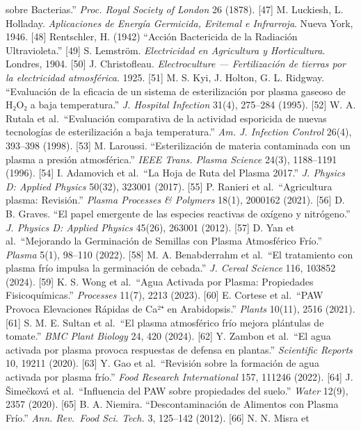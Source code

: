 \documentclass[
  11pt,
  letterpaper,
]{article}
\begin{document}
sobre Bacterias.'' \emph{Proc. Royal Society of London} 26 (1878).
{[}47{]} M. Luckiesh, L. Holladay. \emph{Aplicaciones de Energía
Germicida, Eritemal e Infrarroja}. Nueva York, 1946. {[}48{]}
Rentschler, H. (1942) ``Acción Bactericida de la Radiación
Ultravioleta.'' {[}49{]} S. Lemström. \emph{Electricidad en Agricultura
y Horticultura}. Londres, 1904. {[}50{]} J. Christofleau.
\emph{Electroculture --- Fertilización de tierras por la electricidad
atmosférica}. 1925. {[}51{]} M. S. Kyi, J. Holton, G. L. Ridgway.
``Evaluación de la eficacia de un sistema de esterilización por plasma
gaseoso de H₂O₂ a baja temperatura.'' \emph{J. Hospital Infection}
31(4), 275--284 (1995). {[}52{]} W. A. Rutala et al.~``Evaluación
comparativa de la actividad esporicida de nuevas tecnologías de
esterilización a baja temperatura.'' \emph{Am. J. Infection Control}
26(4), 393--398 (1998). {[}53{]} M. Laroussi. ``Esterilización de
materia contaminada con un plasma a presión atmosférica.'' \emph{IEEE
Trans. Plasma Science} 24(3), 1188--1191 (1996). {[}54{]} I. Adamovich
et al.~``La Hoja de Ruta del Plasma 2017.'' \emph{J. Physics D: Applied
Physics} 50(32), 323001 (2017). {[}55{]} P. Ranieri et al.~``Agricultura
plasma: Revisión.'' \emph{Plasma Processes \& Polymers} 18(1), 2000162
(2021). {[}56{]} D. B. Graves. ``El papel emergente de las especies
reactivas de oxígeno y nitrógeno.'' \emph{J. Physics D: Applied Physics}
45(26), 263001 (2012). {[}57{]} D. Yan et al.~``Mejorando la Germinación
de Semillas con Plasma Atmosférico Frío.'' \emph{Plasma} 5(1), 98--110
(2022). {[}58{]} M. A. Benabderrahm et al.~``El tratamiento con plasma
frío impulsa la germinación de cebada.'' \emph{J. Cereal Science} 116,
103852 (2024). {[}59{]} K. S. Wong et al.~``Agua Activada por Plasma:
Propiedades Fisicoquímicas.'' \emph{Processes} 11(7), 2213 (2023).
{[}60{]} E. Cortese et al.~``PAW Provoca Elevaciones Rápidas de Ca²⁺ en
Arabidopsis.'' \emph{Plants} 10(11), 2516 (2021). {[}61{]} S. M. E.
Sultan et al.~``El plasma atmosférico frío mejora plántulas de tomate.''
\emph{BMC Plant Biology} 24, 420 (2024). {[}62{]} Y. Zambon et al.~``El
agua activada por plasma provoca respuestas de defensa en plantas.''
\emph{Scientific Reports} 10, 19211 (2020). {[}63{]} Y. Gao et
al.~``Revisión sobre la formación de agua activada por plasma frío.''
\emph{Food Research International} 157, 111246 (2022). {[}64{]} J.
Šimečková et al.~``Influencia del PAW sobre propiedades del suelo.''
\emph{Water} 12(9), 2357 (2020). {[}65{]} B. A. Niemira.
``Descontaminación de Alimentos con Plasma Frío.'' \emph{Ann. Rev.~Food
Sci. Tech.} 3, 125--142 (2012). {[}66{]} N. N. Misra et
\end{document}
